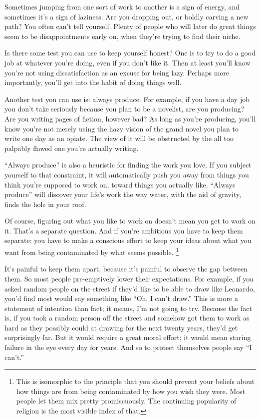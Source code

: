 \documentclass[12pt]{book}
\begin{document}
Sometimes jumping from one sort of work to another is a sign of energy,
and sometimes it's a sign of laziness. Are you dropping out, or boldly
carving a new path? You often can't tell yourself. Plenty of people who
will later do great things seem to be disappointments early on, when
they're trying to find their niche.

Is there some test you can use to keep yourself honest? One is to try to
do a good job at whatever you're doing, even if you don't like it. Then
at least you'll know you're not using dissatisfaction as an excuse for
being lazy. Perhaps more importantly, you'll get into the habit of doing
things well.

Another test you can use is: always produce. For example, if you have a
day job you don't take seriously because you plan to be a novelist, are
you producing? Are you writing pages of fiction, however bad? As long as
you're producing, you'll know you're not merely using the hazy vision of
the grand novel you plan to write one day as an opiate. The view of it
will be obstructed by the all too palpably flawed one you're actually
writing.

``Always produce'' is also a heuristic for finding the work you love. If
you subject yourself to that constraint, it will automatically push you
away from things you think you're supposed to work on, toward things you
actually like. ``Always produce'' will discover your life's work the way
water, with the aid of gravity, finds the hole in your roof.

Of course, figuring out what you like to work on doesn't mean you get to
work on it. That's a separate question. And if you're ambitious you have
to keep them separate: you have to make a conscious effort to keep your
ideas about what you want from being contaminated by what seems
possible. \footnote{This is isomorphic to the principle that you should prevent your
beliefs about how things are from being contaminated by how you wish
they were. Most people let them mix pretty promiscuously. The continuing
popularity of religion is the most visible index of that.}

It's painful to keep them apart, because it's painful to observe the gap
between them. So most people pre-emptively lower their expectations. For
example, if you asked random people on the street if they'd like to be
able to draw like Leonardo, you'd find most would say something like
``Oh, I can't draw.'' This is more a statement of intention than fact;
it means, I'm not going to try. Because the fact is, if you took a
random person off the street and somehow got them to work as hard as
they possibly could at drawing for the next twenty years, they'd get
surprisingly far. But it would require a great moral effort; it would
mean staring failure in the eye every day for years. And so to protect
themselves people say ``I can't.''
\end{document}
